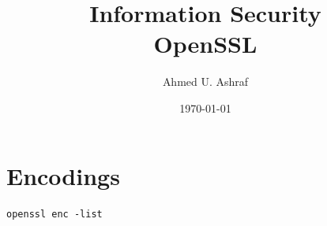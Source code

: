 \documentclass[a4paper, 12pt]{book} %
\title{Information Security \\ OpenSSL}
\author{Ahmed U. Ashraf}
\date{\today }
\begin{document}
% 


\maketitle


\tableofcontents\label{toc}











\chapter{Encodings}




\verb|openssl enc -list|
\end{document}
